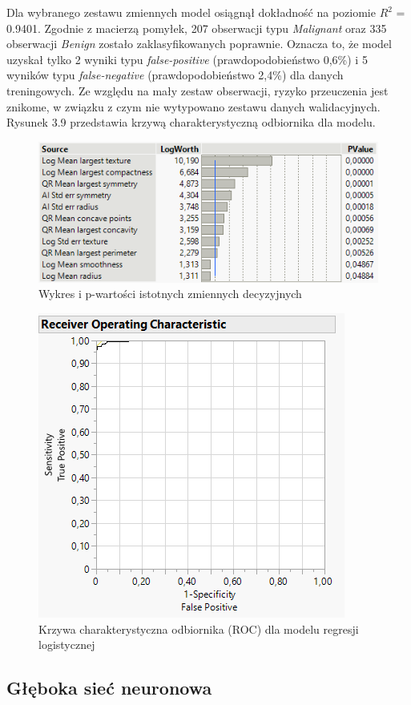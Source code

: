 \newpage
Dla wybranego zestawu zmiennych model osiągnął dokładność na poziomie $R^{2}$ = 0.9401. Zgodnie z macierzą pomyłek, 207 obserwacji typu \textit{Malignant} oraz 335 obserwacji \textit{Benign} zostało zaklasyfikowanych poprawnie. Oznacza to, że model uzyskał tylko 2 wyniki typu \textit{false-positive} (prawdopodobieństwo 0,6\%) i 5 wyników typu \textit{false-negative} (prawdopodobieństwo 2,4\%) dla danych treningowych. Ze względu na mały zestaw obserwacji, ryzyko przeuczenia jest znikome, w związku z czym nie wytypowano zestawu danych walidacyjnych. Rysunek 3.9 przedstawia krzywą charakterystyczną odbiornika dla modelu. 

\begin{figure}[!ht]
	\centering
	\includegraphics[width=0.9\linewidth]{Rozdzial3/pvalue2}
	\caption{Wykres i p-wartości istotnych zmiennych decyzyjnych}
	\label{fig:pvalue2}
\end{figure}

\begin{figure}[!ht]
	\centering
	\includegraphics[width=0.6\linewidth]{Rozdzial3/roc}
	\caption{Krzywa charakterystyczna odbiornika (ROC) dla modelu regresji logistycznej}
	\label{fig:roc}
\end{figure}

\subsection{Głęboka sieć neuronowa}

